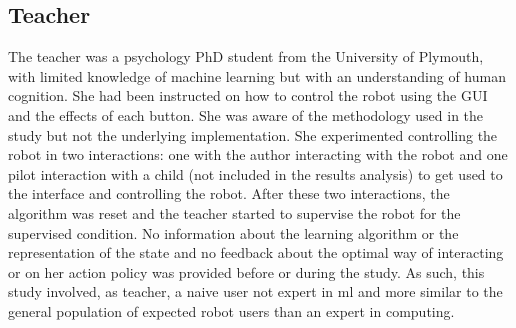 \subsection{Teacher}
The teacher was a psychology PhD student from the University of Plymouth, with limited knowledge of machine learning but with an understanding of human cognition. She had been instructed on how to control the robot using the GUI and the effects of each button. She was aware of the methodology used in the study but not the underlying implementation. She experimented controlling the robot in two interactions: one with the author interacting with the robot and one pilot interaction with a child (not included in the results analysis) to get used to the interface and controlling the robot. After these two interactions, the algorithm was reset and the teacher started to supervise the robot for the supervised condition. No information about the learning algorithm or the representation of the state and no feedback about the optimal way of interacting or on her action policy was provided before or during the study. As such, this study involved, as teacher, a naive user not expert in \gls{ml} and more similar to the general population of expected robot users than an expert in computing.



